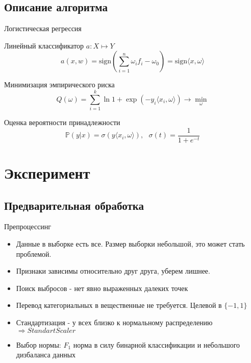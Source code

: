 \documentclass[unicode]{beamer}
\begin{document}
\subsection{Описание алгоритма}
\begin{frame}{Логистическая регрессия}
    \begin{block}{Линейный классификатор $a: X \mapsto Y$}
    $$ a(x, w) = \text{sign}\left( \sum\limits_{i=1}^{n} \omega_i f_i - \omega_0 \right) = \text{sign}\langle x, \omega \rangle  $$
    \end{block}

    \begin{block}{Минимизация эмпирического риска}
        $$ Q(\omega) = \sum\limits_{i=1}^{k} \ln{1 + \exp{(-y_i \langle x_i, \omega \rangle)}} \rightarrow  \min\limits_{\omega}$$
    \end{block}

    \begin{block}{Оценка вероятности принадлежности}
        $$\mathbb{P}(y | x) = \sigma(y \langle x_i, \omega \rangle), \, \, \, \, \sigma(t) = \frac{1}{1 + e^{-t}}$$
    \end{block}
\end{frame}

\section{Эксперимент}
\subsection{Предварительная обработка}
\begin{frame}{Препроцессинг}
    \begin{itemize}
    \item Данные в выборке есть все. Размер выборки небольшой, это может стать проблемой.
    \item Признаки зависимы относительно друг друга, уберем лишнее.
    \item Поиск выбросов - нет явно выраженных далеких точек
    \item Перевод категориальных в вещественные не требуется. Целевой в $\{-1, 1\}$
    \item Стандартизация - у всех близко к нормальному распределению $\Rightarrow StandartScaler$
    \item Выбор нормы: $F_1$ норма в силу бинарной классификации и небольшого дизбаланса данных
    \end{itemize}
\end{frame}
\end{document}
